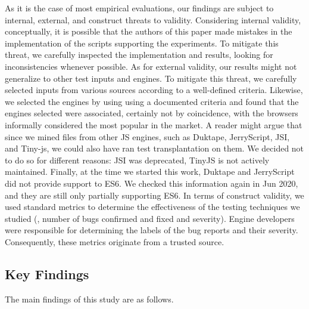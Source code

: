 \documentclass[smallextended]{svjour3}
\begin{document}
As it is the case of most empirical evaluations, our findings are
subject to internal, external, and construct threats to
validity. Considering internal validity, conceptually, it is possible
that the authors of this paper made mistakes in the implementation of
the scripts supporting the experiments. To mitigate this threat, we
carefully inspected the implementation and results, looking for
inconsistencies whenever possible. As for external validity, our
results might not generalize to other test inputs and engines. To
mitigate this threat, we carefully selected inputs from various
sources according to a well-defined criteria. Likewise, we selected
the engines by using using a documented criteria and found that the
engines selected were associated, certainly not by coincidence, with
the browsers informally considered the most popular in the market.  A
reader might argue that since we mined files from other JS engines,
such as Duktape, JerryScript, JSI, and Tiny-js, we could also have ran
test transplantation on them. We decided not to do so for different
reasons: JSI was deprecated, TinyJS is not actively
maintained. Finally, at the time we started this work, Duktape and
JerryScript did not provide support to ES6. We checked this
information again in Jun 2020, and they are still only partially
supporting ES6. In terms of construct validity, we used standard
metrics to determine the effectiveness of the testing techniques we
studied (\eg{}, number of bugs confirmed and fixed and
severity). Engine developers were responsible for determining the
labels of the bug reports and their severity. Consequently, these
metrics originate from a trusted source.


\subsection{Key Findings}
\label{sec:findings}

The main findings of this study are as follows.
\end{document}

